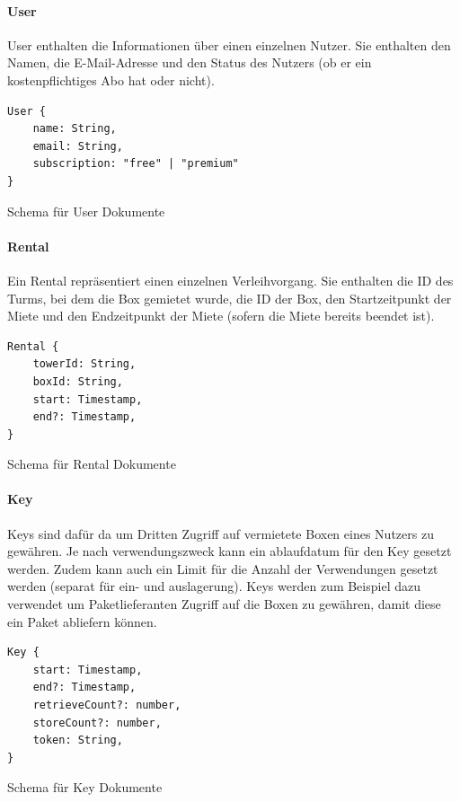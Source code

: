\paragraph{User}
User enthalten die Informationen über einen einzelnen Nutzer. Sie enthalten den Namen, die E-Mail-Adresse und den Status des Nutzers (ob er ein kostenpflichtiges Abo hat oder nicht).

\begin{listing}[H]
    \begin{verbatim}
User {
    name: String,
    email: String,
    subscription: "free" | "premium"
}
\end{verbatim}
    \caption{Schema für User Dokumente}
    \label{lst:datenbankstruktur_user}
\end{listing}


\paragraph{Rental}
Ein Rental repräsentiert einen einzelnen Verleihvorgang. Sie enthalten die ID des Turms, bei dem die Box gemietet wurde, die ID der Box, den Startzeitpunkt der Miete und den Endzeitpunkt der Miete (sofern die Miete bereits beendet ist).

\begin{listing}[H]
    \begin{verbatim}
Rental {
    towerId: String,
    boxId: String,
    start: Timestamp,
    end?: Timestamp,
}
\end{verbatim}
    \caption{Schema für Rental Dokumente}
    \label{lst:datenbankstruktur_rental}
\end{listing}


\paragraph{Key}
Keys sind dafür da um Dritten Zugriff auf vermietete Boxen eines Nutzers zu gewähren. Je nach verwendungszweck kann ein ablaufdatum für den Key gesetzt werden. Zudem kann auch ein Limit für die Anzahl der Verwendungen gesetzt werden (separat für ein- und auslagerung). Keys werden zum Beispiel dazu verwendet um Paketlieferanten Zugriff auf die Boxen zu gewähren, damit diese ein Paket abliefern können.

\begin{listing}[H]
    \begin{verbatim}
Key {
    start: Timestamp,
    end?: Timestamp,
    retrieveCount?: number,
    storeCount?: number,
    token: String,
}
\end{verbatim}
    \caption{Schema für Key Dokumente}
    \label{lst:datenbankstruktur_key}
\end{listing}